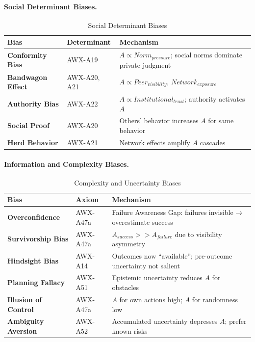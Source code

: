 \paragraph{Social Determinant Biases.}

\begin{table}[htbp]
\centering
\caption{Social Determinant Biases}
\label{tab:social-biases}
\renewcommand{\arraystretch}{1.4}
\begin{tabular}{@{}llp{5.5cm}@{}}
\toprule
\textbf{Bias} & \textbf{Determinant} & \textbf{Mechanism} \\
\midrule
\textbf{Conformity Bias} & AWX-A19 & $A \propto Norm_{pressure}$; social norms dominate private judgment \\
\textbf{Bandwagon Effect} & AWX-A20, A21 & $A \propto Peer_{visibility}$, $Network_{exposure}$ \\
\textbf{Authority Bias} & AWX-A22 & $A \propto Institutional_{trust}$; authority activates $A$ \\
\textbf{Social Proof} & AWX-A20 & Others' behavior increases $A$ for same behavior \\
\textbf{Herd Behavior} & AWX-A21 & Network effects amplify $A$ cascades \\
\bottomrule
\end{tabular}
\end{table}

\paragraph{Information and Complexity Biases.}

\begin{table}[htbp]
\centering
\caption{Complexity and Uncertainty Biases}
\label{tab:complexity-biases}
\renewcommand{\arraystretch}{1.4}
\begin{tabular}{@{}llp{5.5cm}@{}}
\toprule
\textbf{Bias} & \textbf{Axiom} & \textbf{Mechanism} \\
\midrule
\textbf{Overconfidence} & AWX-A47a & Failure Awareness Gap: failures invisible → overestimate success \\
\textbf{Survivorship Bias} & AWX-A47a & $A_{success} >> A_{failure}$ due to visibility asymmetry \\
\textbf{Hindsight Bias} & AWX-A14 & Outcomes now ``available''; pre-outcome uncertainty not salient \\
\textbf{Planning Fallacy} & AWX-A51 & Epistemic uncertainty reduces $A$ for obstacles \\
\textbf{Illusion of Control} & AWX-A47a & $A$ for own actions high; $A$ for randomness low \\
\textbf{Ambiguity Aversion} & AWX-A52 & Accumulated uncertainty depresses $A$; prefer known risks \\
\bottomrule
\end{tabular}
\end{table}

